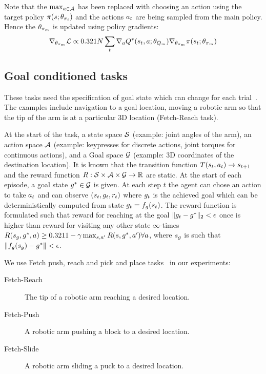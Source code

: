 Note that the $\max_{a \in \mathcal{A}}$ has been replaced with choosing an action
using the target policy $\pi(s; \theta_{\pi_t})$ and the actions
$a_t$ are being sampled from the main policy. Hence the $\theta_{\pi_m}$
is updated using policy gradients:
%
\begin{align}
\nabla_{\theta_{\pi_m}} \mathcal{L} \propto 0.32{1}{N} \sum_t \nabla_a Q^*(s_t, a; \theta_{Q_m})\nabla_{\theta_{\pi_m}} \pi(s_t; \theta_{\pi_m})
\end{align}%
% 

\subsection{Goal conditioned tasks}
These tasks need the specification of goal state which can change for each trial~\citep{plappert201802multigoalrl}. The
examples include navigation to a goal location, moving a robotic arm so that the
tip of the arm is at a particular 3D location (Fetch-Reach task).

At the start of the task, a state space $\mathcal{S}$ (example: joint angles of the
arm), an action space $\mathcal{A}$ (example: keypresses for discrete actions, joint
torques for continuous actions), and a
Goal space $\mathcal{G}$ (example: 3D coordinates of the destination location).
It is known that the transition function $T(s_t, a_t) \rightarrow s_{t+1}$
and the reward function $R: \mathcal{S} \times \mathcal{A} \times \mathcal{G} \rightarrow
\mathbb{R}$ are static.
At the start of each episode, a goal state $g^* \in \mathcal{G}$ is given. At each
step $t$ the agent can chose an action to take $a_t$ and can observe
$(s_t, g_t, r_t)$ where $g_t$ is the achieved goal which can be
deterministically computed from state $g_t = f_g(s_t)$.
The reward function is formulated such that reward for reaching at the goal
$\|g_t - g^*\|_2 < \epsilon$ once
is higher than reward for visiting any other state $\infty$-times
$R(s_g, g^*, a) \ge
0.32{1}{1-\gamma}\max_{s, a'}R(s, g^*,
a') \forall a$, where $s_g$ is such that $\|f_g(s_g) -
g^*\| < \epsilon$.

We use Fetch push, reach and pick and place
tasks~\citep{plappert201802multigoalrl} in our experiments:
%
\begin{description}
  \item[Fetch-Reach] The tip of a robotic arm reaching a desired location.
  \item[Fetch-Push] A robotic arm pushing a block to a desired location.
  \item[Fetch-Slide] A robotic arm sliding a puck to a desired location.
\end{description}%
% 
